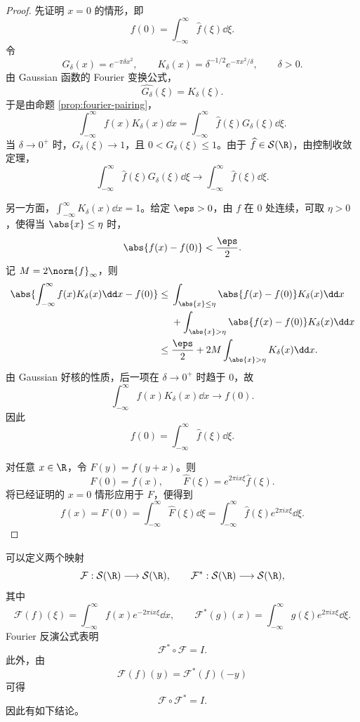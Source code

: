 \begin{proof}
	先证明 $x=0$ 的情形，即
	\[
	f(0)=\int_{-\infty}^{\infty}\widehat f(\xi)\dd\xi.
	\]
	令
	\[
	G_\delta(x)=e^{-\pi\delta x^2},
	\qquad
	K_\delta(x)=\delta^{-1/2}e^{-\pi x^2/\delta},
	\qquad \delta>0.
	\]
	由 Gaussian 函数的 Fourier 变换公式，
	\[
	\widehat{G_\delta}(\xi)=K_\delta(\xi).
	\]
	于是由命题 \ref{prop:fourier-pairing}，
	\[
	\int_{-\infty}^{\infty}f(x)K_\delta(x)\dd x
	=
	\int_{-\infty}^{\infty}\widehat f(\xi)G_\delta(\xi)\dd\xi.
	\]
	当 $\delta\to0^+$ 时，$G_\delta(\xi)\to1$，且 $0<G_\delta(\xi)\leq1$。由于 $\widehat f\in\mathcal S(\R)$，由控制收敛定理，
	\[
	\int_{-\infty}^{\infty}\widehat f(\xi)G_\delta(\xi)\dd\xi
	\longrightarrow
	\int_{-\infty}^{\infty}\widehat f(\xi)\dd\xi.
	\]
	
	另一方面，$\displaystyle\int_{-\infty}^{\infty}K_\delta(x)\dd x=1$。给定 $\eps>0$，由 $f$ 在 $0$ 处连续，可取 $\eta>0$，使得当 $\abs{x}\leq\eta$ 时，
	\[
	\abs{f(x)-f(0)}<\frac{\eps}{2}.
	\]
	记 $M=2\norm{f}_\infty$，则
	\[
	\begin{aligned}
		\abs{\int_{-\infty}^{\infty}f(x)K_\delta(x)\dd x-f(0)}
		\leq{}&
		\int_{\abs{x}\leq\eta}\abs{f(x)-f(0)}K_\delta(x)\dd x\\
		&+
		\int_{\abs{x}>\eta}\abs{f(x)-f(0)}K_\delta(x)\dd x\\
		\leq{}&\frac{\eps}{2}
		+2M\int_{\abs{x}>\eta}K_\delta(x)\dd x.
	\end{aligned}
	\]
	由 Gaussian 好核的性质，后一项在 $\delta\to0^+$ 时趋于 $0$，故
	\[
	\int_{-\infty}^{\infty}f(x)K_\delta(x)\dd x\longrightarrow f(0).
	\]
	因此
	\[
	f(0)=\int_{-\infty}^{\infty}\widehat f(\xi)\dd\xi.
	\]
	
	对任意 $x\in\R$，令 $F(y)=f(y+x)$。则
	\[
	F(0)=f(x),
	\qquad
	\widehat F(\xi)=e^{2\pi ix\xi}\widehat f(\xi).
	\]
	将已经证明的 $x=0$ 情形应用于 $F$，便得到
	\[
	f(x)=F(0)=\int_{-\infty}^{\infty}\widehat F(\xi)\dd\xi=\int_{-\infty}^{\infty}\widehat f(\xi)e^{2\pi ix\xi}\dd\xi.
	\]
\end{proof}

可以定义两个映射
\[
\mathcal F:\mathcal S(\R)\longrightarrow\mathcal S(\R),
\qquad
\mathcal F^*:\mathcal S(\R)\longrightarrow\mathcal S(\R),
\]
其中
\[
\mathcal F(f)(\xi)
=\int_{-\infty}^{\infty}f(x)e^{-2\pi ix\xi}\dd x,
\qquad
\mathcal F^*(g)(x)
=\int_{-\infty}^{\infty}g(\xi)e^{2\pi ix\xi}\dd\xi.
\]
Fourier 反演公式表明
\[
\mathcal F^*\circ\mathcal F=I.
\]
此外，由
\[
\mathcal F(f)(y)=\mathcal F^*(f)(-y)
\]
可得
\[
\mathcal F\circ\mathcal F^*=I.
\]
因此有如下结论。

